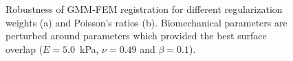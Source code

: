 \documentclass[journal]{IEEEtran}
\begin{document}
\begin{figure}
    \caption{Robustness of GMM-FEM registration for different regularization weights (a) and Poisson's ratios (b). Biomechanical parameters are perturbed around parameters which provided the best surface overlap ($E=5.0$~kPa, $\nu=0.49$ and $\beta=0.1$). \label{fig:exp4fig1}}
\end{figure}
\appendices
\end{document}
